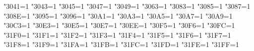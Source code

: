     \def\parseargusing#1#2{%
      \def\argtorun{#2}%
      \begingroup
        \ifx\ltjlineendcomment\thisisundefined
          \catcode"FFFFF=9
        \else
          \catcode\ltjlineendcomment=9
        \fi
        \obeylines
        \spaceisspace
        #1%
        \parseargline\empty%
    }
    \def\comment{\begingroup \catcode`\^^M=\active%
      \ifx\ltjlineendcomment\thisisundefined
        \catcode"FFFFF=9%
      \else
        \catcode\ltjlineendcomment=9%
      \fi
    \catcode`\@=\other \catcode`\{=\other \catcode`\}=\other\commentxxx}%
    \let\setfilename=\comment
    \let\dircategory=\comment
    \let\definfoenclose=\comment
    \let\footnotestyle=\comment
    \def\c{\begingroup \catcode`\^^M=\active%
      \ifx\ltjlineendcomment\thisisundefined
        \catcode"FFFFF=9%
      \else
        \catcode\ltjlineendcomment=9%
      \fi
    \catcode`\@=\other \catcode`\{=\other \catcode`\}=\other%
    \cxxx}
    \let\texinfoc=\c
  \fi %

  \ifx\XeTeXrevision\thisisundefined
  \else
    \def\do#1{\XeTeXcharclass"#1=1 }
    \do{3041}\do{3043}\do{3045}\do{3047}\do{3049}\do{3063}
    \do{3083}\do{3085}\do{3087}\do{308E}\do{3095}\do{3096}
    \do{30A1}\do{30A3}\do{30A5}\do{30A7}\do{30A9}\do{30C3}
    \do{30E3}\do{30E5}\do{30E7}\do{30EE}\do{30F5}\do{30F6}
    \do{30FC}\do{31F0}\do{31F1}\do{31F2}\do{31F3}\do{31F4}
    \do{31F5}\do{31F6}\do{31F7}\do{31F8}\do{31F9}\do{31FA}
    \do{31FB}\do{31FC}\do{31FD}\do{31FE}\do{31FF}

    \def\setjafont#1{%
      \let\zhfont#1\let\zhpunctfont#1%
      \let\zhextafont#1\let\zhextbfont#1%
    }

